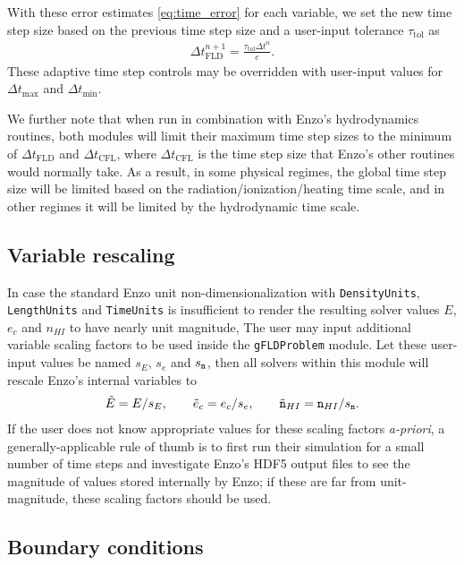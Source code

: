 \documentclass[letterpaper,10pt]{article}
\renewcommand{\(}{\left(}
\renewcommand{\)}{\right)}
\newcommand{\dt}{\Delta t}
\newcommand{\mn}{{\tt n}}
\begin{document}
With these error estimates \eqref{eq:time_error} for each variable, we
set the new time step size based on the previous time step size and a
user-input tolerance $\tau_{\text{tol}}$ as
\begin{align}
\label{eq:time_estimate}
  \dt_{\text{FLD}}^{n+1} = \frac{\tau_{\text{tol}} \dt^n}{e}.
\end{align}
These adaptive time step controls may be overridden with user-input
values for $\dt_{\text{max}}$ and $\dt_{\text{min}}$.

We further note that when run in combination with Enzo's hydrodynamics
routines, both modules will limit their maximum time step sizes to the
minimum of $\dt_{\text{FLD}}$ and $\dt_{\text{CFL}}$, where
$\dt_{\text{CFL}}$ is the time step size that Enzo's other routines
would normally take.  As a result, in some physical regimes, the
global time step size will be limited based on the
radiation/ionization/heating time scale, and in other regimes it will
be limited by the hydrodynamic time scale.




\subsection{Variable rescaling}
\label{sec:variable_rescaling}

In case the standard Enzo unit non-dimensionalization with 
{\tt DensityUnits}, {\tt LengthUnits} and {\tt TimeUnits} is
insufficient to render the resulting solver values $E$, $e_c$ and
$n_{HI}$ to have nearly unit magnitude, The user may input additional
variable scaling factors to be used inside the {\tt gFLDProblem}
module.  Let these user-input values be named $s_E$, $s_e$ and
$s_{\mn}$, then all solvers within this module will rescale Enzo's
internal variables to
\begin{align}
\label{eq:variable_rescaling}
  \tilde{E} = E / s_E, \qquad \tilde{e}_c = e_c / s_e, \qquad \tilde{\mn}_{HI} = \mn_{HI} / s_{\mn}.
\end{align}
If the user does not know appropriate values for these scaling factors
{\em a-priori}, a generally-applicable rule of thumb is to first run
their simulation for a small number of time steps and investigate
Enzo's HDF5 output files to see the magnitude of values stored
internally by Enzo; if these are far from unit-magnitude, these
scaling factors should be used.



\subsection{Boundary conditions}
\label{sec:boundary_conditions}
\end{document}
